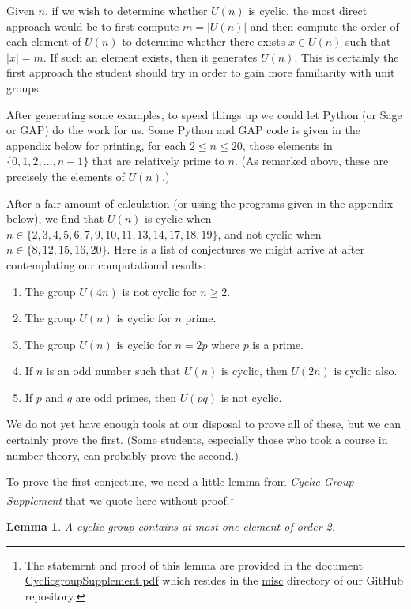 \documentclass[12pt,reqno]{amsart}
\newcommand{\<}{\ensuremath{\langle}}
\renewcommand{\>}{\ensuremath{\rangle}}
\newtheorem*{lemma}{Lemma}
\begin{document}
\begin{enumerate}
Given $n$, if we wish to determine whether $U(n)$ is cyclic, the most direct
approach would be to first compute $m = |U(n)|$ and then compute the order of
each element of $U(n)$ to determine whether there exists 
$x \in U(n)$ such that $|x| = m$.  If such an element exists, then it generates
$U(n)$. This is certainly the first approach the student should try in order to
gain more familiarity with unit groups.

After generating some examples, to speed things up we could let Python (or
Sage or GAP) do the work for us.  Some Python and GAP code is given in the
appendix below for printing, for each $2\leq n \leq 20$, those elements in 
$\{0, 1, 2, \dots, n-1\}$ that are relatively prime to $n$.
(As remarked above, these are precisely the elements of $U(n)$.) 

After a fair amount of calculation (or using the programs given in the
appendix below), we find that $U(n)$ is cyclic when 
$n \in \{2, 3, 4, 5, 6, 7, 9, 10, 11, 13, 14, 17, 18, 19\}$, and not cyclic 
when $n \in \{8, 12, 15, 16, 20\}$. 
Here is a list of conjectures we might arrive at after contemplating our
computational results:
\begin{enumerate}
\item 
The group $U(4n)$ is not cyclic for $n \geq 2$.
\item The group $U(n)$ is cyclic for $n$ prime.
\item The group $U(n)$ is cyclic for $n = 2p$ where $p$ is a prime.
\item If $n$ is an odd number such that $U(n)$ is cyclic, then $U(2n)$ 
is cyclic also.
\item If $p$ and $q$ are odd primes, then $U(pq)$ is not cyclic.
\end{enumerate}
We do not yet have enough tools at our disposal to prove all of these,
but we can certainly prove the first. (Some students, especially those who
took a course in number theory, can probably prove the second.)

To prove the first conjecture, we need a little lemma from 
\emph{Cyclic Group Supplement} 
that we quote here without proof.\footnote{The statement and proof
  of this lemma are provided in the document 
  \href{https://github.com/williamdemeo/Math301-Fall2014/blob/master/misc/CyclicgroupSupplement.pdf}{CyclicgroupSupplement.pdf}
  which resides in the
  \href{https://github.com/williamdemeo/Math301-Fall2014/tree/master/misc}{misc}
  directory of our GitHub repository. 
}
\begin{lemma}
A cyclic group contains at most one element of order 2.  
\end{lemma}


\end{enumerate}
\end{document}
